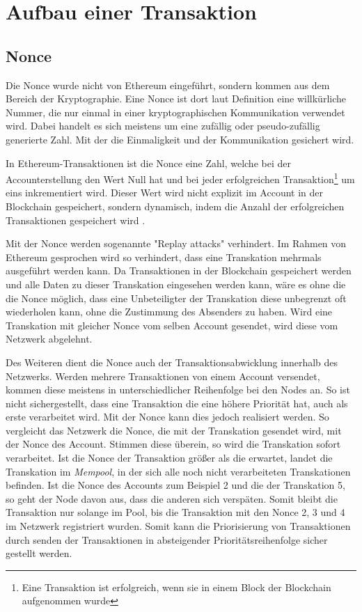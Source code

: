 \documentclass[runningheads]{llncs}
\begin{document}
\section{Aufbau einer Transaktion}

\subsection{Nonce}
\label{nonce}
Die Nonce wurde nicht von Ethereum eingeführt, sondern kommen aus dem Bereich der Kryptographie. Eine Nonce ist dort laut Definition %
eine willkürliche Nummer, die nur einmal in einer kryptographischen Kommunikation verwendet wird. Dabei handelt es sich meistens um eine zufällig oder pseudo-zufällig generierte Zahl. Mit der die Einmaligkeit und der Kommunikation gesichert wird.

In Ethereum-Transaktionen ist die Nonce eine Zahl, welche bei der Accounterstellung den Wert Null hat und bei jeder erfolgreichen Transaktion\footnote{Eine Transaktion ist erfolgreich, wenn sie in einem Block der Blockchain aufgenommen wurde} um eins inkrementiert wird. Dieser Wert wird nicht explizit im Account in der Blockchain gespeichert, sondern dynamisch, indem die Anzahl der erfolgreichen Transaktionen gespeichert wird \cite[S.101]{antonopoulos_mastering_2019}.

Mit der Nonce werden sogenannte "Replay attacks" verhindert. Im Rahmen von Ethereum gesprochen wird so verhindert, dass eine Transkation mehrmals ausgeführt werden kann. Da Transaktionen in der Blockchain gespeichert werden und alle Daten zu dieser Transkation eingesehen werden kann, wäre es ohne die die Nonce möglich, dass eine Unbeteiligter der Transkation diese unbegrenzt oft wiederholen kann, ohne die Zustimmung des Absenders zu haben. Wird eine Transkation mit gleicher Nonce vom selben Account gesendet, wird diese vom Netzwerk abgelehnt.

Des Weiteren dient die Nonce auch der Transaktionsabwicklung innerhalb des Netzwerks.  Werden mehrere Transaktionen von einem Account versendet, kommen diese meistens in unterschiedlicher Reihenfolge bei den Nodes an. So ist nicht sichergestellt, dass eine Transaktion die eine höhere Priorität hat, auch als erste verarbeitet wird. Mit der Nonce kann dies jedoch realisiert werden. So vergleicht das Netzwerk die Nonce, die mit der Transkation gesendet wird, mit der Nonce des Account. Stimmen diese überein, so wird die Transkation sofort verarbeitet. Ist die Nonce der Transaktion größer als die erwartet, landet die Transkation im \textit{Mempool}, in der sich alle noch nicht verarbeiteten Transkationen befinden. Ist die Nonce des Accounts zum Beispiel 2 und die der Transkation 5, so geht der Node davon aus, dass die anderen sich verspäten. Somit bleibt die Transaktion nur solange im Pool, bis die Transaktion mit den Nonce 2, 3 und 4 im Netzwerk registriert wurden. Somit kann die Priorisierung von Transaktionen durch senden der Transaktionen in absteigender Prioritätsreihenfolge sicher gestellt werden.
\end{document}
